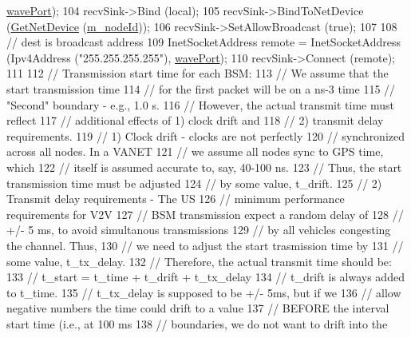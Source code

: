 \begin{DoxyCode}
      \hyperlink{classns3_1_1BsmApplication_a93a6ddc889084ac867d99cfe94e092d2}{wavePort});
104   recvSink->Bind (local);
105   recvSink->BindToNetDevice (\hyperlink{classns3_1_1BsmApplication_a0db360e7cd84744a0e4b85a351b13659}{GetNetDevice} (\hyperlink{classns3_1_1BsmApplication_aa94eecd18ffb201c13f58329781b77b6}{m\_nodeId}));
106   recvSink->SetAllowBroadcast (\textcolor{keyword}{true});
107 
108   \textcolor{comment}{// dest is broadcast address}
109   InetSocketAddress remote = InetSocketAddress (Ipv4Address (\textcolor{stringliteral}{"255.255.255.255"}), 
      \hyperlink{classns3_1_1BsmApplication_a93a6ddc889084ac867d99cfe94e092d2}{wavePort});
110   recvSink->Connect (remote);
111 
112   \textcolor{comment}{// Transmission start time for each BSM:}
113   \textcolor{comment}{// We assume that the start transmission time}
114   \textcolor{comment}{// for the first packet will be on a ns-3 time}
115   \textcolor{comment}{// "Second" boundary - e.g., 1.0 s.}
116   \textcolor{comment}{// However, the actual transmit time must reflect}
117   \textcolor{comment}{// additional effects of 1) clock drift and}
118   \textcolor{comment}{// 2) transmit delay requirements.}
119   \textcolor{comment}{// 1) Clock drift - clocks are not perfectly}
120   \textcolor{comment}{// synchronized across all nodes.  In a VANET}
121   \textcolor{comment}{// we assume all nodes sync to GPS time, which}
122   \textcolor{comment}{// itself is assumed  accurate to, say, 40-100 ns.}
123   \textcolor{comment}{// Thus, the start transmission time must be adjusted}
124   \textcolor{comment}{// by some value, t\_drift.}
125   \textcolor{comment}{// 2) Transmit delay requirements - The US}
126   \textcolor{comment}{// minimum performance requirements for V2V}
127   \textcolor{comment}{// BSM transmission expect a random delay of}
128   \textcolor{comment}{// +/- 5 ms, to avoid simultanous transmissions}
129   \textcolor{comment}{// by all vehicles congesting the channel.  Thus,}
130   \textcolor{comment}{// we need to adjust the start trasmission time by}
131   \textcolor{comment}{// some value, t\_tx\_delay.}
132   \textcolor{comment}{// Therefore, the actual transmit time should be:}
133   \textcolor{comment}{// t\_start = t\_time + t\_drift + t\_tx\_delay}
134   \textcolor{comment}{// t\_drift is always added to t\_time.}
135   \textcolor{comment}{// t\_tx\_delay is supposed to be +/- 5ms, but if we}
136   \textcolor{comment}{// allow negative numbers the time could drift to a value}
137   \textcolor{comment}{// BEFORE the interval start time (i.e., at 100 ms}
138   \textcolor{comment}{// boundaries, we do not want to drift into the}

\end{DoxyCode}
